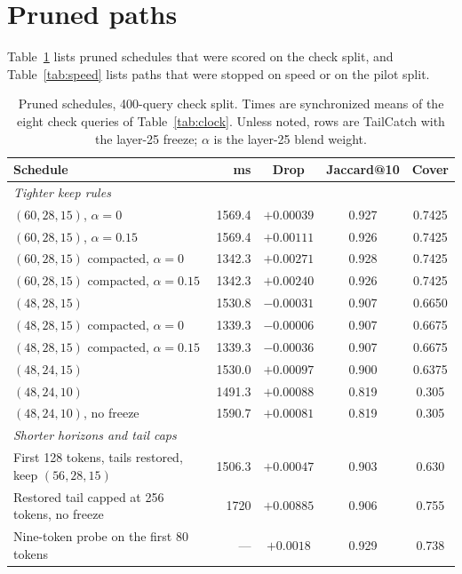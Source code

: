 \documentclass[11pt, a4paper]{article}
\begin{document}
\appendix

\section{Pruned paths}
\label{app:pruned}

Table~\ref{tab:pruned} lists pruned schedules that were scored on the check split, and Table~\ref{tab:speed} lists paths that were stopped on speed or on the pilot split.

\begin{table}[h]
\centering
\small
\caption{Pruned schedules, 400-query check split. Times are synchronized means of the eight check queries of Table~\ref{tab:clock}. Unless noted, rows are TailCatch with the layer-25 freeze; $\alpha$ is the layer-25 blend weight.}
\label{tab:pruned}
\begin{tabular}{lrccc}
\toprule
Schedule & ms & Drop & Jaccard@10 & Cover \\
\midrule
\multicolumn{5}{l}{\emph{Tighter keep rules}} \\
$(60, 28, 15)$, $\alpha = 0$ & 1569.4 & $+0.00039$ & 0.927 & 0.7425 \\
$(60, 28, 15)$, $\alpha = 0.15$ & 1569.4 & $+0.00111$ & 0.926 & 0.7425 \\
$(60, 28, 15)$ compacted, $\alpha = 0$ & 1342.3 & $+0.00271$ & 0.928 & 0.7425 \\
$(60, 28, 15)$ compacted, $\alpha = 0.15$ & 1342.3 & $+0.00240$ & 0.926 & 0.7425 \\
$(48, 28, 15)$ & 1530.8 & $-0.00031$ & 0.907 & 0.6650 \\
$(48, 28, 15)$ compacted, $\alpha = 0$ & 1339.3 & $-0.00006$ & 0.907 & 0.6675 \\
$(48, 28, 15)$ compacted, $\alpha = 0.15$ & 1339.3 & $-0.00036$ & 0.907 & 0.6675 \\
$(48, 24, 15)$ & 1530.0 & $+0.00097$ & 0.900 & 0.6375 \\
$(48, 24, 10)$ & 1491.3 & $+0.00088$ & 0.819 & 0.305 \\
$(48, 24, 10)$, no freeze & 1590.7 & $+0.00081$ & 0.819 & 0.305 \\
\midrule
\multicolumn{5}{l}{\emph{Shorter horizons and tail caps}} \\
First 128 tokens, tails restored, keep $(56, 28, 15)$ & 1506.3 & $+0.00047$ & 0.903 & 0.630 \\
Restored tail capped at 256 tokens, no freeze & 1720 & $+0.00885$ & 0.906 & 0.755 \\
Nine-token probe on the first 80 tokens & --- & $+0.0018$ & 0.929 & 0.738 \\

\end{tabular}
\end{table}
\end{document}
